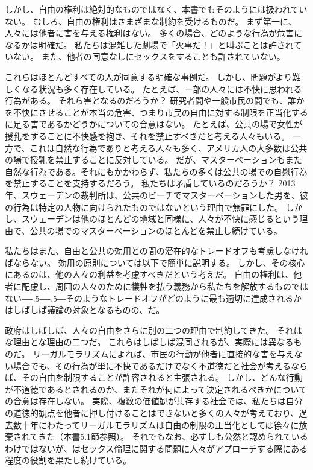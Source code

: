 \documentclass[paper=a4,book,openany]{jlreq}
\def\DDASH{―\kern-.5\zw―\kern-.5\zw―} %
\begin{document}
しかし、自由の権利は絶対的なものではなく、本書でもそのようには扱われていない。
むしろ、自由の権利はさまざまな制約を受けるものだ。
まず第一に、人々には他者に害を与える権利はない。
多くの場合、どのような行為が危害になるかは明確だ。
私たちは混雑した劇場で「火事だ！」と叫ぶことは許されていない。
また、他者の同意なしにセックスをすることも許されていない。

これらはほとんどすべての人が同意する明確な事例だ。
しかし、問題がより難しくなる状況も多く存在している。
たとえば、一部の人々には不快に思われる行為がある。
それら害となるのだろうか？ 研究者間や一般市民の間でも、誰かを不快にさせることが本当の危害、つまり市民の自由に対する制限を正当化するに足る害であるかどうかについての合意はない。
たとえば、公共の場で女性が授乳をすることに不快感を抱き、それを禁止すべきだと考える人々もいる。
一方で、これは自然な行為でありと考える人々も多く、アメリカ人の大多数は公共の場で授乳を禁止することに反対している\citep{cdc08:_public_opinion_breas}。
だが、マスターベーションもまた自然な行為である。それにもかかわらず、私たちの多くは公共の場での自慰行為を禁止することを支持するだろう。
私たちは矛盾しているのだろうか？ 2013年、スウェーデンの裁判所は、公共のビーチでマスターベーションした男を、彼の行為は特定の人物に向けられたものではないという理由で無罪にした\citep{ederyd13:_you_cant_just_walk_aroun}。
しかし、スウェーデンは他のほとんどの地域と同様に、人々が不快に感じるという理由で、公共の場でのマスターベーションのほとんどを禁止し続けている。

私たちはまた、自由と公共の効用との間の潜在的なトレードオフも考慮しなければならない。
効用の原則については以下で簡単に説明する。
しかし、その核心にあるのは、他の人々の利益を考慮すべきだという考えだ。
自由の権利は、他者に配慮し、周囲の人々のために犠牲を払う義務から私たちを解放するものではない{\DDASH}そのようなトレードオフがどのように最も適切に達成されるかはしばしば議論の対象となるものの、だ。

政府はしばしば、人々の自由をさらに別の二つの理由で制約してきた。
それはな理由とな理由の二つだ。
これらはしばしば混同されるが、実際には異なるものだ。
リーガルモラリズムによれば、市民の行動が他者に直接的な害を与えない場合でも、その行為が単に不快であるだけでなく不道徳だと社会が考えるならば、その自由を制限することが許容されると主張される。
しかし、どんな行動が不道徳であるとされるのか、またそれが何によって決定されるべきかについての合意は存在しない。
実際、複数の価値観が共存する社会では、私たちは自分の道徳的観点を他者に押し付けることはできないと多くの人々が考えており、過去数十年にわたってリーガルモラリズムは自由の制限の正当化としては徐々に放棄されてきた（本書5.1節参照）。
それでもなお、必ずしも公然と認められているわけではないが、はセックス倫理に関する問題に人々がアプローチする際にある程度の役割を果たし続けている。
\end{document}
